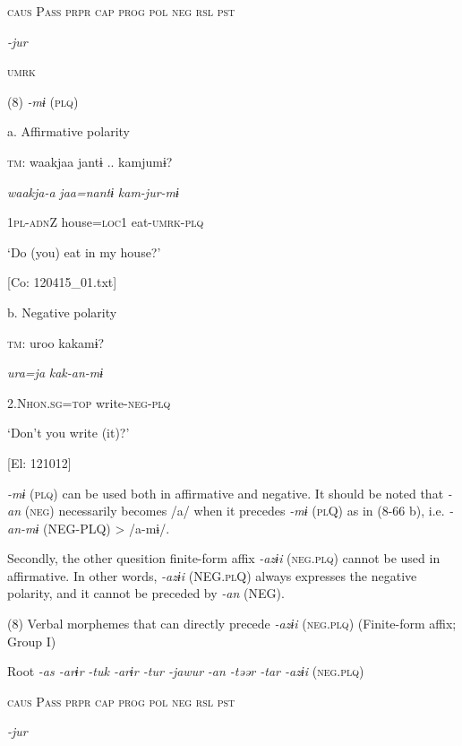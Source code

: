     \textsc{caus}  P\textsc{ass}  \textsc{prpr}  \textsc{cap}  \textsc{prog}  \textsc{pol}  \textsc{neg}  \textsc{rsl}  \textsc{pst}

          \textit{{}-jur} 

          \textsc{umrk}

(8)  \textit{{}-mɨ} (\textsc{plq})

  a. Affirmative polarity

  \textsc{tm}:  waakjaa  jantɨ ..  kamjumɨ?

    \textit{waakja-a}  \textit{jaa=nantɨ}  \textit{kam{}-jur-mɨ}

    1\textsc{pl}-\textsc{adn}Z  house=\textsc{loc}1  eat-\textsc{umrk}-\textsc{plq}

    ‘Do (you) eat in my house?’

    [Co: 120415\_01.txt]

  b. Negative polarity

  \textsc{tm}:  uroo  kakamɨ?

    \textit{ura=ja}  \textit{kak-an-mɨ}

    2.N\textsc{hon}.\textsc{sg}=\textsc{top}  write-\textsc{neg}-\textsc{plq}

    ‘Don’t you write (it)?’

    [El: 121012]

\textit{{}-mɨ} (\textsc{plq}) can be used both in affirmative and negative. It should be noted that \textit{{}-an} (\textsc{neg}) necessarily becomes /a/ when it precedes \textit{{}-mɨ} (\textsc{pl}Q) as in (8-66 b), i.e. \textit{{}-an-mɨ} (NEG-PLQ) > /a-mɨ/.

Secondly, the other quesition finite-form affix \textit{{}-azɨi} (\textsc{neg}.\textsc{plq}) cannot be used in affirmative. In other words, \textit{{}-azɨi} (NEG.\textsc{pl}Q) always expresses the negative polarity, and it cannot be preceded by \textit{{}-an} (NEG).

(8)  Verbal morphemes that can directly precede \textit{-azɨi} (\textsc{neg}.\textsc{plq}) (Finite-form affix; Group I)

  Root  \textit{{}-as  {}-arɨr} %
\textit{{}-tuk  {}-arɨr  {}-tur  {}-jawur} %
\textit{{}-an  {}-təər  {}-tar  {}-azɨi} (\textsc{neg}.\textsc{plq})

    \textsc{caus}  P\textsc{ass}  \textsc{prpr}  \textsc{cap}  \textsc{prog}  \textsc{pol}  \textsc{neg}  \textsc{rsl}  \textsc{pst}

          \textit{{}-jur} 

